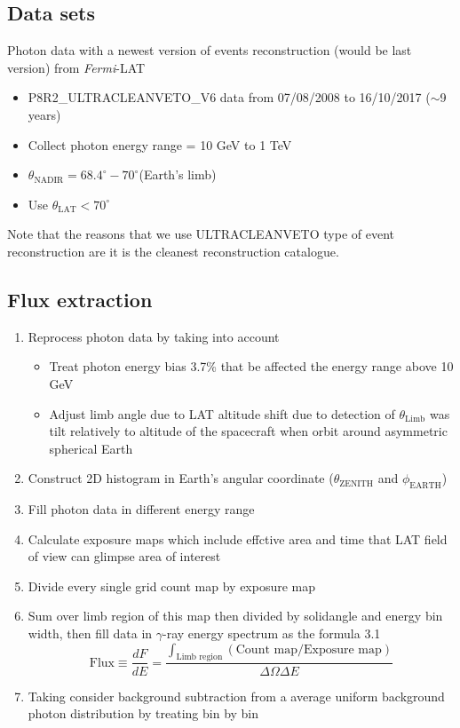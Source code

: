 \subsection{Data sets}
Photon data with a newest version of events reconstruction (would be last version) from \textit{Fermi}-LAT
\begin{itemize}
    \item P8R2\_ULTRACLEANVETO\_V6 data from 07/08/2008 to 16/10/2017 ($\sim$9 years)
    \item Collect photon energy range = 10 GeV to 1 TeV
    \item $\theta_{\text{NADIR}} = 68.4^\circ - 70^\circ$(Earth’s limb) 
    \item Use $\theta_{\text{LAT}} < 70^\circ$
\end{itemize}
Note that the reasons that we use ULTRACLEANVETO type of event reconstruction are it is the cleanest reconstruction catalogue.

\subsection{Flux extraction}
\begin{enumerate}
    \item Reprocess photon data by taking into account
        \begin{itemize}
            \item Treat photon energy bias 3.7\% that be affected the energy range above 10 GeV
            \item Adjust limb angle due to LAT altitude shift due to detection of $\theta_{\text{Limb}}$ was tilt relatively to altitude of the spacecraft when orbit around asymmetric spherical Earth 
        \end{itemize}
    \item Construct 2D histogram in Earth's angular coordinate ($\theta_{\text{ZENITH}}$ and $\phi_{\text{EARTH}}$)
    \item Fill photon data in different energy range
    \item Calculate exposure maps which include effctive area and time that LAT field of view can glimpse area of interest
    \item Divide every single grid count map by exposure map
    \item Sum over limb region of this map then divided by solidangle and energy bin width, then fill data in $\gamma$-ray energy spectrum as the formula 3.1
    \begin{equation}
        \text{Flux}\equiv\frac{dF}{dE} = \frac{\int_{\text{Limb region}} (\text{Count map}/\text{Exposure map})}{\Delta\Omega\Delta E}
    \end{equation}
    \item Taking consider background subtraction from a average uniform background photon distribution by treating bin by bin 
\end{enumerate}


